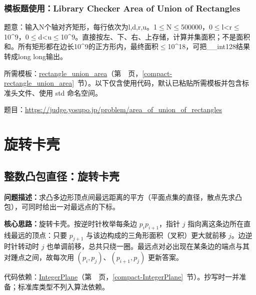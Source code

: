 

\Needspace{307pt}

\subsection*{模板题使用：Library Checker Area of Union of Rectangles}

\label{usage-example-202}

题意：输入N个轴对齐矩形，每行依次为l,d,r,u。1$\le$N$\le$500000，0$\le$l<r$\le$10\textasciicircum{}9，0$\le$d<u$\le$10\textasciicircum{}9。直接按左、下、右、上存储，计算并集面积；不是面积和。所有矩形都在边长10\textasciicircum{}9的正方形内，最终面积$\le$10\textasciicircum{}18，可把\_\_int128结果转成long long输出。

所需模板：\hyperref[compact-rectangle_union_area]{rectangle\_\allowbreak{}union\_\allowbreak{}area}（第~\pageref{compact-rectangle_union_area}~页，\ref{compact-rectangle_union_area}~节）。以下仅含使用代码，默认已粘贴所需模板并包含标准头文件、使用 std 命名空间。

题目：\url{https://judge.yosupo.jp/problem/area_of_union_of_rectangles}



\Needspace{543pt}

\chapter{旋转卡壳}

\section{整数凸包直径：旋转卡壳}\label{compact-convex_diameter2}

\noindent\textbf{问题描述：}\allowbreak 求凸多边形顶点间最远距离的平方（平面点集的直径，散点先求凸包），可同时给出一对最远点的下标。

\textbf{核心思路：}\allowbreak 旋转卡壳。按逆时针枚举每条边 $p_ip_{i+1}$，指针 $j$ 指向离这条边所在直线最远的顶点：只要 $p_{j+1}$ 与该边构成的三角形面积（叉积）更大就前移 $j$。边逆时针转动时 $j$ 也单调前移，总共只绕一圈。最远点对必出现在某条边的端点与其对踵点之间，故每次用 $(p_i,p_j)$、$(p_{i+1},p_j)$ 更新答案。

代码依赖：\hyperref[compact-IntegerPlane]{IntegerPlane}（第~\pageref{compact-IntegerPlane}~页，\ref{compact-IntegerPlane}~节）。抄写时一并准备；标准库类型不列入算法依赖。

